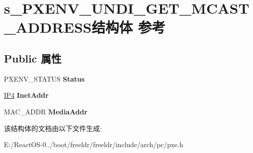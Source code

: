 \hypertarget{structs___p_x_e_n_v___u_n_d_i___g_e_t___m_c_a_s_t___a_d_d_r_e_s_s}{}\section{s\+\_\+\+P\+X\+E\+N\+V\+\_\+\+U\+N\+D\+I\+\_\+\+G\+E\+T\+\_\+\+M\+C\+A\+S\+T\+\_\+\+A\+D\+D\+R\+E\+S\+S结构体 参考}
\label{structs___p_x_e_n_v___u_n_d_i___g_e_t___m_c_a_s_t___a_d_d_r_e_s_s}
\subsection*{Public 属性}
\begin{DoxyCompactItemize}
\item 
\mbox{\label{structs___p_x_e_n_v___u_n_d_i___g_e_t___m_c_a_s_t___a_d_d_r_e_s_s_a02a14e5574196a4f91a3ba0ac7790749}} 
P\+X\+E\+N\+V\+\_\+\+S\+T\+A\+T\+US {\bfseries Status}
\item 
\mbox{\label{structs___p_x_e_n_v___u_n_d_i___g_e_t___m_c_a_s_t___a_d_d_r_e_s_s_aa344e82f1a44df93c238bee6850aae05}} 
\hyperlink{union_i_p4}{I\+P4} {\bfseries Inet\+Addr}
\item 
\mbox{\label{structs___p_x_e_n_v___u_n_d_i___g_e_t___m_c_a_s_t___a_d_d_r_e_s_s_a5e82451b9659b8ee7b27e13e4fb76ceb}} 
M\+A\+C\+\_\+\+A\+D\+DR {\bfseries Media\+Addr}
\end{DoxyCompactItemize}


该结构体的文档由以下文件生成\+:\begin{DoxyCompactItemize}
\item 
E\+:/\+React\+O\+S-\/0../boot/freeldr/freeldr/include/arch/pc/pxe.\+h\end{DoxyCompactItemize}
